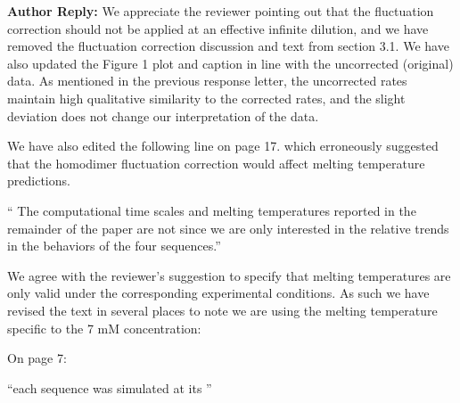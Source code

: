 \documentclass[11pt,a4paper]{letter} %
\newcommand*{\rood}[1]{{\color{red}{#1}}}
\newcommand*{\roodr}[1]{{\color{red}{#1}}}
\begin{document}

\textbf{Author Reply:} We appreciate the reviewer pointing out that the fluctuation correction should not be applied at an effective infinite dilution, and we have removed the fluctuation correction discussion and text from section 3.1. We have also updated the Figure 1 plot and caption in line with the uncorrected (original) data. As mentioned in the previous response letter, the uncorrected rates maintain high qualitative similarity to the corrected rates, and the slight deviation does not change our interpretation of the data.

We have also edited the following line on page 17. which erroneously suggested that the homodimer fluctuation correction would affect melting temperature predictions.

`` The computational time scales and melting temperatures reported in the remainder of the paper are not \roodr{corrected by these calibration corrections} since we are only interested in the relative trends in the behaviors of the four sequences.''

We agree with the reviewer's suggestion to specify that melting temperatures are only valid under the corresponding experimental conditions. As such we have revised the text in several places to note we are using the melting temperature specific to the 7 mM concentration:

On page 7:

``each sequence was simulated at its \rood{respective melting temperature at 7mM concentration as dictated by the 3SPN.2 model}''
\end{document}
